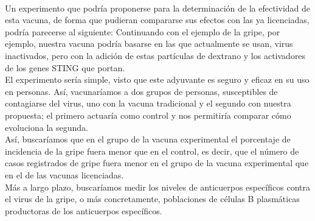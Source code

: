 \documentclass[a4paper,11pt]{article}
\begin{document}
\\Un experimento que podría proponerse para la determinación de la efectividad de esta vacuna, de forma que pudieran compararse sus efectos con las ya licenciadas, podría parecerse al siguiente:
Continuando con el ejemplo de la gripe, por ejemplo, nuestra vacuna podría basarse en las que actualmente se usan, virus inactivados, pero con la adición de estas partículas de dextrano y los activadores de los genes STING que portan. 
\\El experimento sería simple, visto que este adyuvante es seguro y eficaz en su uso en personas. Así, vacunaríamos a dos grupos de personas, susceptibles de contagiarse del virus, uno con la vacuna tradicional y el segundo con nuestra propuesta; el primero actuaría como control y nos permitiría comparar cómo evoluciona la segunda.
\\Así, buscaríamos que en el grupo de la vacuna experimental el porcentaje de incidencia de la gripe fuera menor que en el control, es decir, que el número de casos registrados de gripe fuera menor en el grupo de la vacuna experimental que en el de las vacunas licenciadas.
\\Más a largo plazo, buscaríamos medir los niveles de anticuerpos específicos contra el virus de la gripe, o más concretamente, poblaciones de células B plasmáticas productoras de los anticuerpos específicos.
\end{document}
